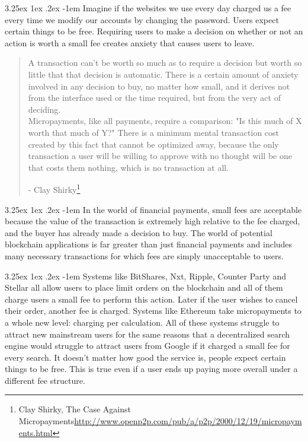\documentclass{article}
\makeatletter
\renewcommand\paragraph{\@startsection{paragraph}{5}{\z@}%
  {3.25ex \@plus1ex \@minus.2ex}%
  {-1em}%
  {\normalfont\normalsize\bfseries}}
\makeatother
\begin{document}
                \paragraph{}
                    Imagine if the websites we use every day charged us a fee every time we modify our accounts by changing the password. Users expect certain things to be free. Requiring users to make a decision on whether or not an action is worth a small fee creates anxiety that causes users to leave.

                \begin{quote}
                        A transaction can't be worth so much as to require a decision but worth so little that that decision is automatic. There is a certain amount of anxiety involved in any decision to buy, no matter how small, and it derives not from the interface used or the time required, but from the very act of deciding.\\

                        Micropayments, like all payments, require a comparison: "Is this much of X worth that much of Y?" There is a minimum mental transaction cost created by this fact that cannot be optimized away, because the only transaction a user will be willing to approve with no thought will be one that costs them nothing, which is no transaction at all.

                        - Clay Shirky\protect\footnote{Clay Shirky, The Case Against Micropayments\newline\url{http://www.openp2p.com/pub/a/p2p/2000/12/19/micropayments.html}}\\
                \end{quote}

                \paragraph{}
                    In the world of financial payments, small fees are acceptable because the value of the transaction is extremely high relative to the fee charged, and the buyer has already made a decision to buy. The world of potential blockchain applications is far greater than just financial payments and includes many necessary transactions for which fees are simply unacceptable to users.

                \paragraph{}
                    Systems like BitShares, Nxt, Ripple, Counter Party and Stellar all allow users to place limit orders on the blockchain and all of them charge users a small fee to perform this action. Later if the user wishes to cancel their order, another fee is charged. Systems like Ethereum take micropayments to a whole new level: charging per calculation. All of these systems struggle to attract new mainstream users for the same reasons that a decentralized search engine would struggle to attract users from Google if it charged a small fee for every search. It doesn't matter how good the service is, people expect certain things to be free. This is true even if a user ends up paying more overall under a different fee structure.
\end{document}
